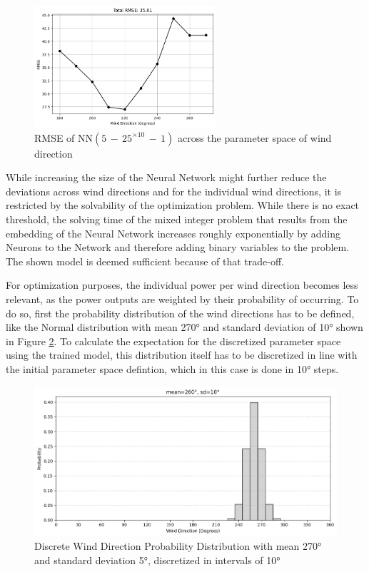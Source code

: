 \begin{figure}[h] 
	\centering
	\includegraphics[width=0.6\textwidth]{figures/optimization/rmse_dist_3layers50nodes.png}
	\caption{RMSE of  $\text{NN}(5\,{-}\,25^{\times10}\,{-}\,1)$ across the parameter space of wind direction }
	\label{fig:rmse_dist_3layers50nodes}
\end{figure}

While increasing the size of the Neural Network might further reduce the deviations across wind directions and for the individual wind directions, it is restricted by the solvability of the optimization problem. While there is no exact threshold, the solving time of the mixed integer problem that results from the embedding of the Neural Network increases roughly exponentially by adding Neurons to the Network and therefore adding binary variables to the problem. The shown model is deemed sufficient because of that trade-off.

For optimization purposes, the individual power per wind direction becomes less relevant, as the power outputs are weighted by their probability of occurring. 
To do so, first the probability distribution of the wind directions has to be defined, like the Normal distribution with mean 270° and standard deviation of 10° shown in Figure \ref{fig:wind_dist_opti}. To calculate the expectation for the discretized parameter space using the trained model, this distribution itself has to be discretized in line with the initial parameter space defintion, which in this case is done in 10° steps. 


\begin{figure}[h] 
	\centering
	\includegraphics[width=1\textwidth]{figures/optimization/wind_dist_opti.png} 
	\caption{Discrete Wind Direction Probability Distribution with mean 270° and standard deviation 5°, discretized in intervals of 10° }
	\label{fig:wind_dist_opti}
\end{figure}


